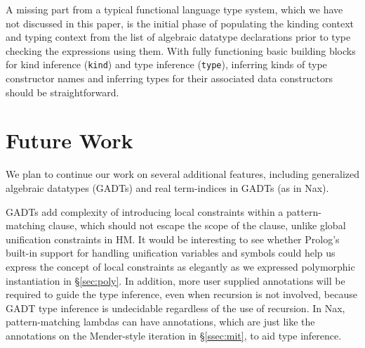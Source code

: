 \documentclass[runningheads,a4paper]{llncs}
\begin{document}
A missing part from a typical functional language type system, which
we have not discussed in this paper, is the initial phase of populating
the kinding context and typing context from the list of algebraic datatype
declarations prior to type checking the expressions using them.
With fully functioning basic building blocks for kind inference
(\verb|kind|) and type inference (\verb|type|), inferring kinds of
type constructor names and inferring types for their associated
data constructors should be straightforward.


\section{Future Work}\label{sec:futwork}
We plan to continue our work on several additional features, including
generalized algebraic datatypes (GADTs) and real term-indices
in GADTs (as in Nax). %

GADTs add complexity of introducing local constraints
within a pattern-matching clause, which should not escape
the scope of the clause, unlike global unification constraints in HM.
It would be interesting to see whether Prolog's built-in support for
handling unification variables and symbols could help us express
the concept of local constraints as elegantly as we expressed
polymorphic instantiation in \S\ref{sec:poly}. In addition,
more user supplied annotations will be required to guide the type inference,
even when recursion is not involved, because GADT type inference is
undecidable \cite{DegtyarevV95} regardless of the use of recursion.
In Nax, pattern-matching lambdas can have annotations, which are
just like the annotations on the Mender-style iteration in \S\ref{ssec:mit},
to aid type inference.
\end{document}
